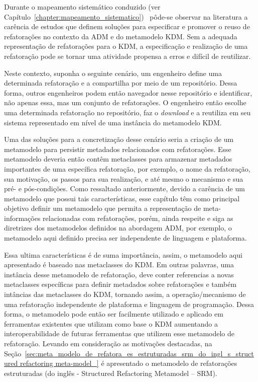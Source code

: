 Durante o mapeamento sistemático conduzido (ver Capítulo~\ref{chapter:mapeamento_sistematico})~\cite{durelli_systematic_mapping} pôde-se observar na literatura a carência de estudos que definem soluções para especificar e promover o reuso de refatorações no contexto da ADM e do metamodelo KDM. Sem a adequada representação de refatorações para o KDM, a especificação e realização de uma refatoração pode se tornar uma atividade propensa a erros e difícil de reutilizar.

Neste contexto, suponha o seguinte cenário, um engenheiro define uma determinada refatoração e a compartilha por meio de um repositório. Dessa forma, outros engenheiros podem então navegador nesse repositório e identificar, não apenas essa, mas um conjunto de refatorações. O engenheiro então escolhe uma determinada refatoração no repositório, faz o \textit{download} e a reutiliza em seu sistema representado em nível de uma instância do metamodelo KDM. 

Uma das soluções para a concretização desse cenário seria a criação de um metamodelo para persistir metadados relacionados com refatorações. Esse metamodelo deveria então contêm metaclasses para armazenar metadados importantes de uma específica refatoração, por exemplo, o nome da refatoração, sua motivação, os passos para sua realização, e até mesmo o mecanismo e sua pré- e pós-condições. Como ressaltado anteriormente, devido a carência de um metamodelo que possui tais características, esse capítulo têm como principal objetivo definir um metamodelo que permita a representação de meta-informações relacionadas com refatorações, porém, ainda respeite e siga as diretrizes dos metamodelos definidos na abordagem ADM, por exemplo, o metamodelo aqui definido precisa ser independente de linguagem e plataforma.

Essa ultima características é de suma importância, assim, o metamodelo aqui apresentado é baseado nas metaclasses do KDM. Em outras palavras, uma instância desse metamodelo de refatoração, deve conter referencias a novas metaclasses específicas para definir metadados sobre refatorações e também intâncias das metaclasses do KDM, tornando assim, a operação/mecanismo de uma refatoração independente de plataforma e linguagem de programação. Dessa forma, o metamodelo pode então ser facilmente utilizado e aplicado em ferramentas existentes que utilizam como base o KDM aumentando a interoperabilidade de futuras ferramentas que utilizem esse metamodelo de refatoração. Levando em consideração as motivações destacadas, na Seção~\ref{sec:meta_modelo_de_refatora_es_estruturadas_srm_do_ingl_s_structured refactoring meta-model_} é apresentado o metamodelo de refatorações estruturadas (do inglês - Structured Refactoring Metamodel – SRM).  


